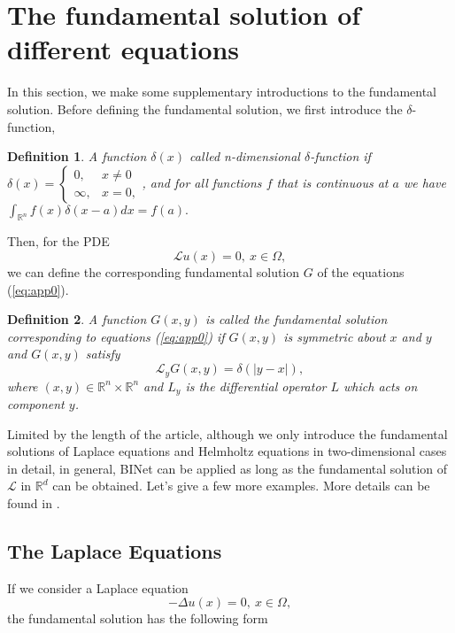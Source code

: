 \documentclass[hyperref]{article}
\numberwithin{equation}{section}
\theoremstyle{nonumberplain}
\newtheorem{definition}{Definition}[section]
\begin{document}
	
	
	\section{The fundamental solution of different equations}
	In this section, we make some supplementary introductions to the fundamental solution. Before defining the fundamental solution, we first introduce the $\delta$-function, 
	\begin{definition}
		A function $\delta(x)$ called n-dimensional $\delta$-function if $\delta(x) = \left\{\begin{array}{cc}
			0, & x \neq 0 \\
			\infty, & x=0,
		\end{array}\right.$, and for all functions $f$ that is continuous at $a$ we have
		$\int_{\mathbb{R}^n} f(x)  \delta(x-a) d x=f(a).$
	\end{definition}
	Then, for the PDE
	\begin{equation}
		\mathcal{L}u(x)=0,\ x\in\Omega,
		\label{eq:app0}
	\end{equation}
	we can define the corresponding fundamental solution $G$ of the equations (\ref{eq:app0}).
	\begin{definition}
		A function $G(x,y)$ is called the fundamental solution corresponding to equations (\ref{eq:app0}) if $G(x,y)$ is symmetric about $x$ and $y$ and $G(x,y)$ satisfy
		$$
		\mathcal{L}_yG(x,y)=\delta(|y-x|),
		$$
		where $(x,y)\in\mathbb{R}^n\times\mathbb{R}^n$ and $L_y$ is the differential operator $L$ which acts on component $y$.
	\end{definition}
	
	
	
	
	Limited by the length of the article, although we only introduce the fundamental solutions of Laplace equations and Helmholtz equations in two-dimensional cases in detail, in general, BINet can be applied as long as the fundamental solution of $\mathcal{L}$ in $\mathbb{R}^d$ can be obtained. Let's give a few more examples. More details can be found in \cite{hsiao2008boundary,kellogg1953foundations,ying2009fast}.
	\subsection{The Laplace Equations}
	If we consider a Laplace equation
	\begin{equation}
		-\Delta u(x)=0, \ x\in\Omega,
	\end{equation}
	the fundamental solution has the following form 
	
\end{document}
